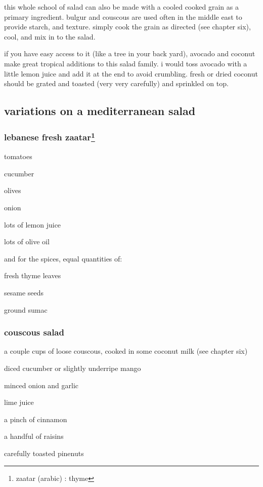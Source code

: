 this whole school of salad can also be made with a cooled cooked grain as a 
primary ingredient. bulgur and couscous are used often in the middle east to 
provide starch, and texture. simply cook the grain as directed (see chapter 
six), cool, and mix in to the salad.

if you have easy access to it (like a tree in your back yard), avocado and 
coconut make great tropical additions to this salad family. i would toss 
avocado with a little lemon juice and add it at the end to avoid crumbling. 
fresh or dried coconut should be grated and toasted (very very carefully) and 
sprinkled on top.

\subsection{variations on a mediterranean salad}

\subsubsection{lebanese fresh zaatar\footnote{zaatar (arabic) : thyme}}

\begin{ingredients}
  \item tomatoes
  \item cucumber
  \item olives
  \item onion
  \item lots of lemon juice
  \item lots of olive oil
\end{ingredients}

and for the spices, equal quantities of:

\begin{ingredients}
  \item fresh thyme leaves
  \item sesame seeds
  \item ground sumac
\end{ingredients}

\subsubsection{couscous salad}

\begin{ingredients}
  \item a couple cups of loose couscous, cooked in some coconut milk (see chapter six)
  \item diced cucumber or slightly underripe mango
  \item minced onion and garlic
  \item lime juice
  \item a pinch of cinnamon
  \item a handful of raisins
  \item carefully toasted pinenuts
\end{ingredients}

